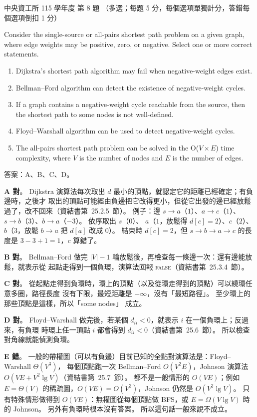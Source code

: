 \begin{pastexam}[label={px:ncu-115-dsa-08}]{中央資工所 115 學年度 第 8 題}
（多選；每題 5 分，每個選項單獨計分，答錯每個選項倒扣 1 分）

Consider the single-source or all-pairs shortest path problem on a given graph, where edge weights may be positive, zero, or negative. Select one or more correct statements.
\begin{enumerate}[label=\Alph*.]
\item Dijkstra's shortest path algorithm may fail when negative-weight edges exist.
\item Bellman--Ford algorithm can detect the existence of negative-weight cycles.
\item If a graph contains a negative-weight cycle reachable from the source, then the shortest path to some nodes is not well-defined.
\item Floyd--Warshall algorithm can be used to detect negative-weight cycles.
\item The all-pairs shortest path problem can be solved in the O($V\times E$) time complexity, where $V$ is the number of nodes and $E$ is the number of edges.
\end{enumerate}
\end{pastexam}

\begin{pastsoln}
答案：A、B、C、D。

\textbf{A 對}。 Dijkstra 演算法每次取出 $d$ 最小的頂點，就認定它的距離已經確定；有負邊時，之後才
取出的頂點可能經由負邊把它改得更小，但從它出發的邊已經放鬆過了，改不回來（資結書第~25.2.5~節）。
例子：邊 $s \to a$（$1$）、$a \to c$（$1$）、$s \to b$（$3$）、$b \to a$（$-3$）。 依序取出 $s$（$0$）、
$a$（$1$，放鬆得 $d[c] = 2$）、$c$（$2$）、$b$（$3$，放鬆 $b \to a$ 把 $d[a]$ 改成 $0$）。 結束時
$d[c] = 2$，但 $s \to b \to a \to c$ 的長度是 $3 - 3 + 1 = 1$，$c$ 算錯了。

\textbf{B 對}。 Bellman--Ford 做完 $|V| - 1$ 輪放鬆後，再檢查每一條邊一次：還有邊能放鬆，就表示從
起點走得到一個負環，演算法回報 \textsc{false}（資結書第~25.3.4~節）。

\textbf{C 對}。 從起點走得到負環時，環上的頂點（以及從環走得到的頂點）可以繞環任意多圈，路徑長度
沒有下限，最短距離是 $-\infty$，沒有「最短路徑」。 至少環上的那些頂點是這樣，所以「some nodes」
成立。

\textbf{D 對}。 Floyd--Warshall 做完後，若某個 $d_{ii} < 0$，就表示 $i$ 在一個負環上；反過來，有負環
時環上任一頂點 $i$ 都會得到 $d_{ii} < 0$（資結書第~25.6~節）。 所以檢查對角線就能偵測負環。

\textbf{E 錯}。 一般的帶權圖（可以有負邊）目前已知的全點對演算法是：Floyd--Warshall $\Theta(V^3)$，
每個頂點跑一次 Bellman--Ford $O(V^2 E)$，Johnson 演算法 $O(VE + V^2 \lg V)$（資結書第~25.7~節）。
都不是一般情形的 $O(VE)$；例如 $E = \Theta(V)$ 的稀疏圖，$O(VE) = O(V^2)$，Johnson 仍然是
$O(V^2 \lg V)$。 只有特殊情形做得到 $O(VE)$：無權圖從每個頂點做 BFS，或 $E = \Omega(V \lg V)$ 時的
Johnson。 另外有負環時根本沒有答案。 所以這句話一般來說不成立。
\end{pastsoln}
